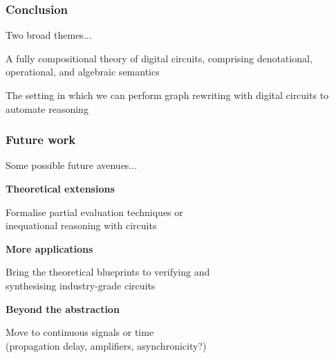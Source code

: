 \begin{frame}
    \frametitle{Conclusion}

    \pause

    \Large
    \centering

    Two broad themes...

    \pause

    \vspace{1em}

    A \alert{fully compositional} theory of digital circuits, comprising
    \alert{denotational}, \alert{operational}, and \alert{algebraic} semantics

    \pause

    \vspace{1em}

    The setting in which we can perform \alert{graph rewriting} with digital
    circuits to automate reasoning

\end{frame}

\begin{frame}
    \frametitle{Future work}
    \centering

    \pause

    Some possible future avenues...

    \Large
    \pause
    \textbf{Theoretical extensions}

    \large

    Formalise \alert{partial evaluation} techniques or \\
    \alert{inequational} reasoning with circuits

    \Large
    \pause
    \textbf{More applications}

    \large
    Bring the theoretical blueprints to \alert{verifying} and \\
    \alert{synthesising} industry-grade circuits

    \Large
    \pause
    \textbf{Beyond the abstraction}

    \large
    Move to continuous signals or time \\
    (propagation delay, amplifiers, asynchronicity?)

\end{frame}